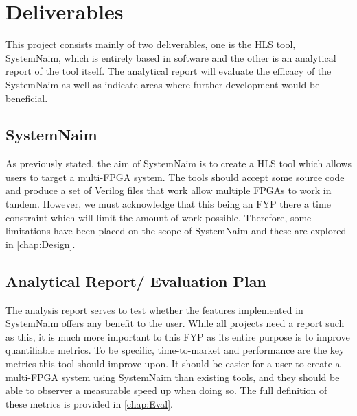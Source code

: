 \section{Deliverables}

This project consists mainly of two deliverables, one is the HLS tool, SystemNaim, which is entirely based in software and the other is an analytical report of the tool itself. The analytical report will evaluate the efficacy of the SystemNaim as well as indicate areas where further development would be beneficial.

\subsection{SystemNaim}

As previously stated, the aim of SystemNaim is to create a HLS tool which allows users to target a multi-FPGA system. The tools should accept some source code and produce a set of Verilog files that work allow multiple FPGAs to work in tandem. However, we must acknowledge that this being an FYP there a time constraint which will limit the amount of work possible. Therefore, some limitations have been placed on the scope of SystemNaim and these are explored in \autoref{chap:Design}. 

\subsection{Analytical Report/ Evaluation Plan}
\label{subsec:eval_plan}

The analysis report serves to test whether the features implemented in SystemNaim offers any benefit to the user. While all projects need a report such as this, it is much more important to this FYP as its entire purpose is to improve quantifiable metrics. To be specific, time-to-market and performance are the key metrics this tool should improve upon. It should be easier for a user to create a multi-FPGA system using SystemNaim than existing tools, and they should be able to observer a measurable speed up when doing so. The full definition of these metrics is provided in \autoref{chap:Eval}.





